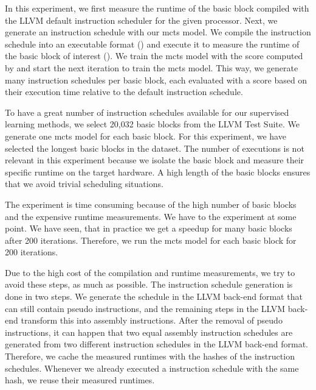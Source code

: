 In this experiment, we first measure the runtime of the basic block compiled with the LLVM default instruction scheduler for the given processor.
Next, we generate an instruction schedule with our \ac{mcts} model.
We compile the instruction schedule into an executable format () and execute it to measure the runtime of the basic block of interest ().
We train the \ac{mcts} model with the score computed by  and start the next iteration to train the \ac{mcts} model.
This way, we generate many instruction schedules per basic block, each evaluated with a score based on their execution time relative to the default instruction schedule.


To have a great number of instruction schedules available for our supervised learning methods, we select 20,032 basic blocks from the LLVM Test Suite.
We generate one \ac{mcts} model for each basic block.
For this experiment, we have selected the longest basic blocks in the dataset.
The number of executions is not relevant in this experiment because we isolate the basic block and measure their specific runtime on the target hardware.
A high length of the basic blocks ensures that we avoid trivial scheduling situations.

The experiment is time consuming because of the high number of basic blocks and the expensive runtime measurements.
We have to the experiment at some point.
We have seen, that in practice we get a speedup for many basic blocks after 200 iterations.
Therefore, we run the \ac{mcts} model for each basic block for 200 iterations.


Due to the high cost of the compilation and runtime measurements, we try to avoid these steps, as much as possible.
The instruction schedule generation is done in two steps.
We generate the schedule in the LLVM back-end format that can still contain pseudo instructions, and the remaining steps in the LLVM back-end transform this into assembly instructions.
After the removal of pseudo instructions, it can happen that two equal assembly instruction schedules are generated from two different instruction schedules in the LLVM back-end format.
Therefore, we cache the measured runtimes with the hashes of the instruction schedules.
Whenever we already executed a instruction schedule with the same hash, we reuse their measured runtimes.

